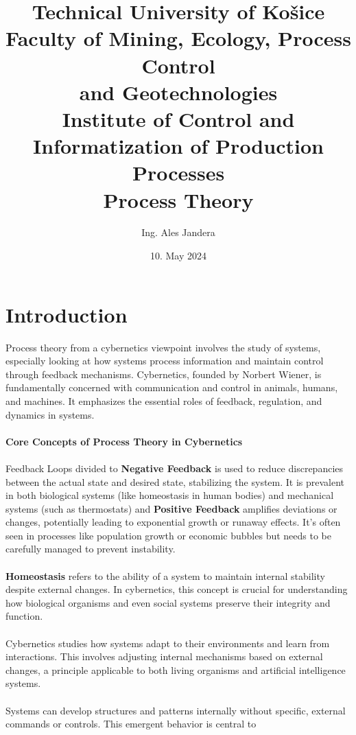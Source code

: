 \documentclass[12pt]{article}
\title{
{\textbf{Technical University of Košice}}\\
\vspace{12pt}
{\large \textbf{Faculty of Mining, Ecology, Process Control\\ and Geotechnologies}}\\
\vspace{12pt}
{\large Institute of Control and Informatization of Production Processes}\\
\vspace{64pt}
{\textbf{Process Theory}}\\
}
\author{Ing. Ales Jandera}
\date{10. May 2024}
\begin{document}
\maketitle

\newpage

\tableofcontents

\newpage

\section{Introduction}
Process theory from a cybernetics viewpoint involves the study of systems,
especially looking at how systems process information and maintain control
through feedback mechanisms. Cybernetics, founded by Norbert Wiener, is
fundamentally concerned with communication and control in animals, humans,
and machines. It emphasizes the essential roles of feedback, regulation,
and dynamics in systems.\\
\\
\textbf{Core Concepts of Process Theory in Cybernetics}\\
\\
Feedback Loops divided to \textbf{Negative Feedback} is used to reduce
discrepancies between the actual state and desired state,
stabilizing the system. It is prevalent in both biological systems 
(like homeostasis in human bodies) and mechanical systems (such as
thermostats) and \textbf{Positive Feedback} amplifies deviations or changes,
potentially leading to exponential growth or runaway effects. It's often
seen in processes like population growth or economic bubbles but needs
to be carefully managed to prevent instability.\\
\\
\textbf{Homeostasis} refers to the ability of a system to maintain
internal stability despite external changes. In cybernetics, this
concept is crucial for understanding how biological organisms and even
social systems preserve their integrity and function.\\
\\
Cybernetics studies how systems adapt to their environments and learn
from interactions. This involves adjusting internal mechanisms based on
external changes, a principle applicable to both living organisms and
artificial intelligence systems.\\
\\
Systems can develop structures and patterns internally without specific,
external commands or controls. This emergent behavior is central to
\end{document}
